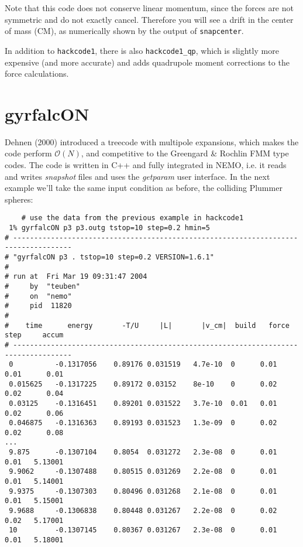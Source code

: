 Note that this code does not conserve linear momentum, since the
forces are not symmetric and do not exactly cancel. Therefore
you will see a drift in the center of mass (CM), as numerically
shown by the output of {\tt snapcenter}.

In addition to {\tt hackcode1}, there is also
{\tt hackcode1\_qp}, which is slightly more expensive (and more accurate) and adds
quadrupole moment corrections to the force calculations. 

\section{gyrfalcON}

Dehnen (2000) introduced a treecode with multipole expansions, which makes
the code perform $\mathcal{O}(N)$, and competitive to the
Greengard \& Rochlin FMM type codes. The code is written in C++ and fully integrated
in NEMO, i.e. it reads and writes {\it snapshot} files and uses the
{\it getparam} user interface. In the next example we'll take the same input condition
as before, the colliding Plummer spheres:


\footnotesize\begin{verbatim}
    # use the data from the previous example in hackcode1
 1% gyrfalcON p3 p3.outg tstop=10 step=0.2 hmin=5
# ------------------------------------------------------------------------------------
# "gyrfalcON p3 . tstop=10 step=0.2 VERSION=1.6.1"
#
# run at  Fri Mar 19 09:31:47 2004
#     by  "teuben"
#     on  "nemo"
#     pid  11820
#
#    time      energy       -T/U     |L|       |v_cm|  build   force    step     accum
# ------------------------------------------------------------------------------------
 0          -0.1317056    0.89176 0.031519   4.7e-10  0      0.01       0.01      0.01
 0.015625   -0.1317225    0.89172 0.03152    8e-10    0      0.02       0.02      0.04
 0.03125    -0.1316451    0.89201 0.031522   3.7e-10  0.01   0.01       0.02      0.06
 0.046875   -0.1316363    0.89193 0.031523   1.3e-09  0      0.02       0.02      0.08
...
 9.875      -0.1307104    0.8054  0.031272   2.3e-08  0      0.01       0.01   5.13001
 9.9062     -0.1307488    0.80515 0.031269   2.2e-08  0      0.01       0.01   5.14001
 9.9375     -0.1307303    0.80496 0.031268   2.1e-08  0      0.01       0.01   5.15001
 9.9688     -0.1306838    0.80448 0.031267   2.2e-08  0      0.02       0.02   5.17001
 10         -0.1307145    0.80367 0.031267   2.3e-08  0      0.01       0.01   5.18001

\end{verbatim}\normalsize

